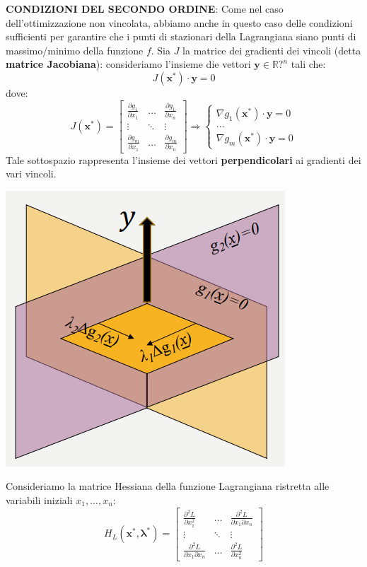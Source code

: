 \documentclass[12pt]{article}
\begin{document}
\textbf{CONDIZIONI DEL SECONDO ORDINE}: \newline
Come nel caso dell'ottimizzazione non vincolata, abbiamo anche in questo caso delle condizioni sufficienti per garantire che i punti di stazionari della Lagrangiana siano punti di massimo/minimo della funzione $f$.
Sia $J$ la matrice dei gradienti dei vincoli (detta \textbf{matrice Jacobiana}):
consideriamo l'insieme die vettori $\boldsymbol{y} \in \mathbb{R}?^n$ tali che:
$$J(\boldsymbol{x}^*) \cdot \boldsymbol{y} = 0$$
dove:
$$J(\boldsymbol{x}^*) = \begin{bmatrix}
    \frac{\partial g_1}{\partial x_1} & \dots & \frac{\partial g_1}{\partial x_n} \\
    \vdots & \ddots & \vdots \\
    \frac{\partial g_m}{\partial x_1} & \dots & \frac{\partial g_m}{\partial x_n}
\end{bmatrix} \Rightarrow \begin{cases}
    \nabla g_1 (\boldsymbol{x}^*) \cdot \boldsymbol{y} = 0 \\
    \dots \\
    \nabla g_m (\boldsymbol{x}^*) \cdot \boldsymbol{y} = 0
\end{cases}$$
Tale sottospazio rappresenta l'insieme dei vettori \textbf{perpendicolari} ai gradienti dei vari vincoli.
\begin{center}
    \includegraphics[width = 0.45\linewidth]{Images/109.PNG}
\end{center}
Consideriamo la matrice Hessiana della funzione Lagrangiana ristretta alle variabili iniziali $x_1,...,x_n$:
$$H_L(\boldsymbol{x}^*, \boldsymbol{\lambda}^*) = \begin{bmatrix}
    \frac{\partial^2 L}{\partial x_1^2} & \dots & \frac{\partial^2 L}{\partial x_1 \partial x_n} \\
    \vdots & \ddots & \vdots \\
    \frac{\partial^2 L}{\partial x_1 \partial x_n} & \dots & \frac{\partial^2 L}{\partial x_n^2}
\end{bmatrix}$$
\end{document}
